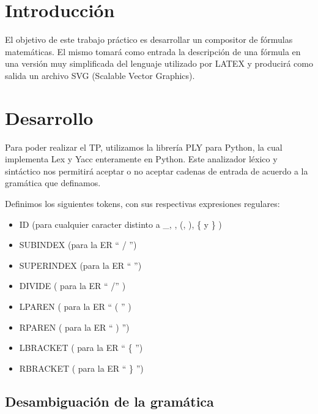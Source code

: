 \documentclass[a4paper, 10pt, twoside]{article}
\begin{document}
\newpage

\tableofcontents

\newpage


\section{Introducción}
El objetivo de este trabajo práctico es desarrollar un compositor de fórmulas matemáticas. El mismo tomará como entrada la descripción de una fórmula en una versión muy simplificada del lenguaje utilizado por LATEX y producirá como salida un archivo SVG (Scalable Vector Graphics).

\section{Desarrollo}
Para poder realizar el TP, utilizamos la librería PLY para Python, la cual implementa Lex y Yacc enteramente en Python. Este analizador léxico y sintáctico nos permitirá aceptar o no aceptar cadenas de entrada de acuerdo a la gramática que definamos.

Definimos los siguientes tokens, con sus respectivas expresiones regulares: 
\begin{itemize}
  \item ID (para cualquier caracter distinto a \_, \detokenize{^}, (, ), \{ y \} )
  \item SUBINDEX (para la ER `` / '')
  \item SUPERINDEX (para la ER `` \detokenize{^} '')
  \item DIVIDE ( para la ER `` /'' )
  \item LPAREN ( para la ER `` ( '' )
  \item RPAREN ( para la ER `` ) '')
  \item LBRACKET ( para la ER `` \{ '')
  \item RBRACKET ( para la ER `` \} '')
\end{itemize}

\subsection{Desambiguación de la gramática}
\end{document}
